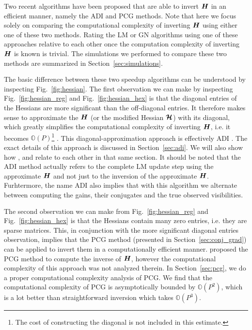 \documentclass[useAMS,usenatbib]{mn2e}
\newcommand{\bH}{\bmath{H}}
\newcommand{\bmH}{\bmath{\mathcal{H}}}
\begin{document}
Two recent algorithms have been proposed that are able to invert $\bH$ in an efficient manner, namely the ADI \citep{Marthi2014} and PCG \citep{Liu2010} methods. 
Note that here we focus solely on comparing the computational complexity of inverting $\bH$ using either one of these two methods. Rating the LM or GN algorithms
using one of these approaches relative to each other once the computation complexity of inverting $\bH$ is known is trivial. The simulations we performed to compare these two 
methods are summarized in Section~\ref{sec:simulations}.


The basic difference between these two speedup algorithms can be understood by inspecting Fig.~\ref{fig:hessian}. The first observation we can make by inspecting 
Fig.~\ref{fig:hessian_reg} and Fig.~\ref{fig:hessian_hex} is that the diagonal entries of the Hessians are more significant than the off-diagonal entries.
It therefore makes sense to approximate the $\bH$ (or the modified Hessian $\bmH$) with its diagonal, which greatly simplifies the computational complexity of inverting 
$\bH$, i.e. it becomes $\mathbb{O}(P)$\footnote{The cost of constructing 
the diagonal is not included in this estimate.} \citep{Smirnov2015}. This diagonal-approximation approach is effectively ADI \citep{Marthi2014}. The exact details of this 
approach is discussed in Section~\ref{sec:adi}. We will also show how \citet{Marthi2014}, \citet{Smirnov2015} and \citet{Salvini2014} relate to each other in that same section. It should be noted that the ADI method actually refers to the complete LM update step using the approximate $\bH$ and not just 
to the inversion of the approximate $\bH$. Furhtermore, the name ADI also implies that with this algorithm we alternate between computing the 
gains, their conjugates and the true observed visibilities. %

The second observation we can make from Fig.~\ref{fig:hessian_reg} and Fig.~\ref{fig:hessian_hex} is that the Hessians contain many zero entries, i.e. they are sparse matrices. This, in conjunction with the more significant diagonal entries observation, implies that the PCG method (presented in Section~\ref{sec:conj_grad}) 
can be applied to invert them in a computationally efficient manner. \citet{Liu2010} proposed the PCG method to compute the inverse of $\bH$, however the computational complexity of this approach was not analyzed therein.  
In Section~\ref{sec:pcg}, we do a proper computational complexity analysis of PCG. We find that the computational complexity of PCG is asymptotically bounded by $\mathbb{O}(P^2)$, which is 
a lot better than straightforward inversion which takes $\mathbb{O}(P^3)$. 
\end{document}
